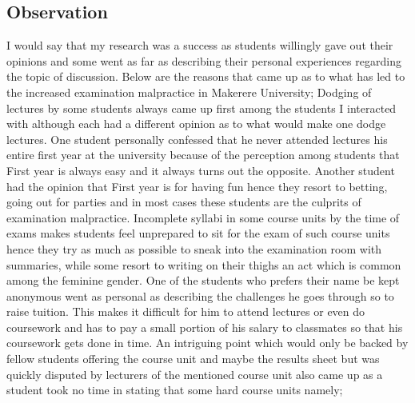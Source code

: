 \documentclass {article}
\begin{document}
\subsection{Observation}
I would say that my research was a success as students willingly gave out their opinions and some went as far as describing their personal experiences regarding the topic of discussion. Below are the reasons that came up as to what has led to the increased examination malpractice in Makerere University; Dodging of lectures by some students always came up first among the students I interacted with although each had a different opinion as to what would make one dodge lectures. One student personally confessed that he never attended lectures his entire first year at the university because of the perception among students that First year is always easy and it always turns out the opposite. Another student had the opinion that First year is for having fun hence they resort to betting, going out for parties and in most cases these students are the culprits of examination malpractice. Incomplete syllabi in some course units by the time of exams makes students feel unprepared to sit for the exam of such course units hence they try as much as possible to sneak into the examination room with summaries, while some resort to writing on their thighs an act which is common among the feminine gender. One of the students who prefers their name be kept anonymous went as personal as describing the challenges he goes through so to raise tuition. This makes it difficult for him to attend lectures or even do coursework and has to pay a small portion of his salary to classmates so that his coursework gets done in time. An intriguing point which would only be backed by fellow students offering the course unit and maybe the results sheet but was quickly disputed by lecturers of the mentioned course unit also came up as a student took no time in stating that some hard course units namely;
\end{document}
